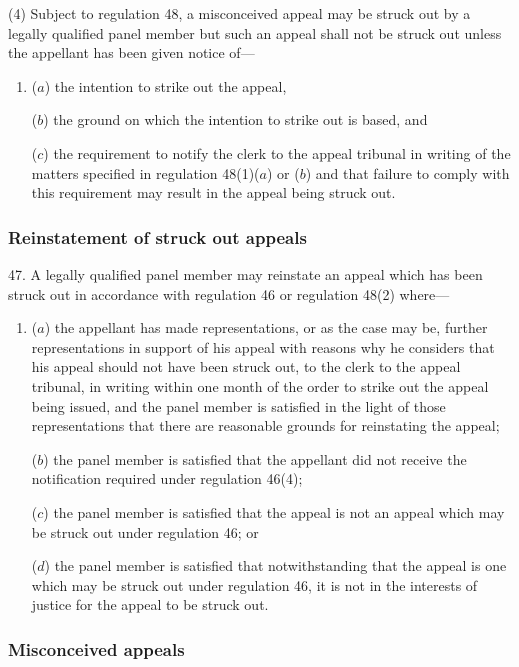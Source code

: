 \documentclass[12pt,a4paper]{article}
\begin{document}
(4) Subject to regulation 48, a misconceived appeal may be struck out by a legally qualified panel member but such an appeal shall not be struck out unless the appellant has been given notice of—
\begin{enumerate}\item[]
($a$) the intention to strike out the appeal,

($b$) the ground on which the intention to strike out is based, and

($c$) the requirement to notify the clerk to the appeal tribunal in writing of the matters specified in regulation 48(1)($a$) or ($b$) and that failure to comply with this requirement may result in the appeal being struck out.
\end{enumerate}

\subsubsection[47. Reinstatement of struck out appeals]{Reinstatement of struck out appeals}

47.  A legally qualified panel member may reinstate an appeal which has been struck out in accordance with regulation 46 or regulation 48(2) where—
\begin{enumerate}\item[]
($a$) the appellant has made representations, or as the case may be, further representations in support of his appeal with reasons why he considers that his appeal should not have been struck out, to the clerk to the appeal tribunal, in writing within one month of the order to strike out the appeal being issued, and the panel member is satisfied in the light of those representations that there are reasonable grounds for reinstating the appeal;

($b$) the panel member is satisfied that the appellant did not receive the notification required under regulation 46(4);

($c$) the panel member is satisfied that the appeal is not an appeal which may be struck out under regulation 46; or

($d$) the panel member is satisfied that notwithstanding that the appeal is one which may be struck out under regulation 46, it is not in the interests of justice for the appeal to be struck out.
\end{enumerate}

\subsubsection[48. Misconceived appeals]{Misconceived appeals}
\end{document}

